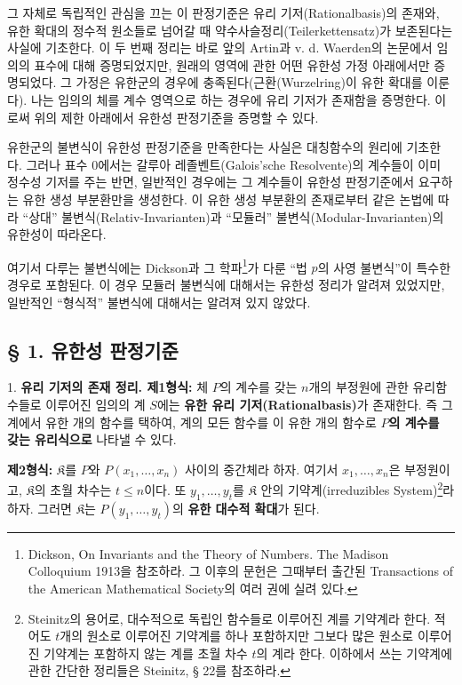 그 자체로 독립적인 관심을 끄는 이 판정기준은 유리 기저(Rationalbasis)의 존재와, 유한 확대의 정수적 원소들로 넘어갈 때 약수사슬정리(Teilerkettensatz)가 보존된다는 사실에 기초한다. 이 두 번째 정리는 바로 앞의 Artin과 v. d. Waerden의 논문에서 임의의 표수에 대해 증명되었지만, 원래의 영역에 관한 어떤 유한성 가정 아래에서만 증명되었다. 그 가정은 유한군의 경우에 충족된다(근환(Wurzelring)이 유한 확대를 이룬다). 나는 임의의 체를 계수 영역으로 하는 경우에 유리 기저가 존재함을 증명한다. 이로써 위의 제한 아래에서 유한성 판정기준을 증명할 수 있다.

유한군의 불변식이 유한성 판정기준을 만족한다는 사실은 대칭함수의 원리에 기초한다. 그러나 표수 0에서는 갈루아 레졸벤트(Galois'sche Resolvente)의 계수들이 이미 정수성 기저를 주는 반면, 일반적인 경우에는 그 계수들이 유한성 판정기준에서 요구하는 유한 생성 부분환만을 생성한다. 이 유한 생성 부분환의 존재로부터 같은 논법에 따라 ``상대'' 불변식(Relativ-Invarianten)과 ``모듈러'' 불변식(Modular-Invarianten)의 유한성이 따라온다.

여기서 다루는 불변식에는 Dickson과 그 학파\footnote{Dickson, On Invariants and the Theory of Numbers. The Madison Colloquium 1913을 참조하라. 그 이후의 문헌은 그때부터 출간된 Transactions of the American Mathematical Society의 여러 권에 실려 있다.}가 다룬 ``법 $p$의 사영 불변식''이 특수한 경우로 포함된다. 이 경우 모듈러 불변식에 대해서는 유한성 정리가 알려져 있었지만, 일반적인 ``형식적'' 불변식에 대해서는 알려져 있지 않았다.

\subsection*{§ 1. 유한성 판정기준}

1. \textbf{유리 기저의 존재 정리. 제1형식:} 체 $P$의 계수를 갖는 $n$개의 부정원에 관한 유리함수들로 이루어진 임의의 계 $S$에는 \textbf{유한 유리 기저(Rationalbasis)}가 존재한다. 즉 그 계에서 유한 개의 함수를 택하여, 계의 모든 함수를 이 유한 개의 함수로 \textbf{$P$의 계수를 갖는 유리식으로} 나타낼 수 있다.

\textbf{제2형식:} $\mathfrak K$를 $P$와 $P(x_1,\ldots,x_n)$ 사이의 중간체라 하자. 여기서 $x_1,\ldots,x_n$은 부정원이고, $\mathfrak K$의 초월 차수는 $t\leq n$이다. 또 $y_1,\ldots,y_t$를 $\mathfrak K$ 안의 기약계(irreduzibles System)\footnote{Steinitz의 용어로, 대수적으로 독립인 함수들로 이루어진 계를 기약계라 한다. 적어도 $t$개의 원소로 이루어진 기약계를 하나 포함하지만 그보다 많은 원소로 이루어진 기약계는 포함하지 않는 계를 초월 차수 $t$의 계라 한다. 이하에서 쓰는 기약계에 관한 간단한 정리들은 Steinitz, § 22를 참조하라.}라 하자. 그러면 $\mathfrak K$는 $P(y_1,\ldots,y_t)$의 \textbf{유한 대수적 확대}가 된다.

